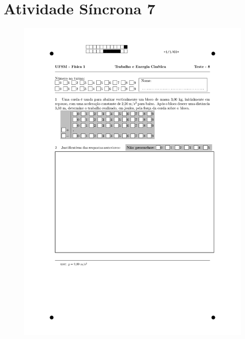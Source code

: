 \section{Atividade Síncrona 7} \label{ch:orp1e7}
\vspace*{\fill}
\begin{figure}[H]\centering
\includegraphics[scale=0.7]{fig/orp1q7_page-0001.jpg}
\end{figure}
\vspace*{\fill}
